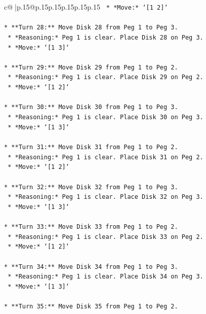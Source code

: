\documentclass{article}
\begin{document}
{\begin{supertabular}{c@{$\;$}|p{.15\linewidth}@{}p{.15\linewidth}p{.15\linewidth}p{.15\linewidth}p{.15\linewidth}p{.15\linewidth}}
{{{\texttt{    *   *Move:* `{[}1 2{]}`} \\
\\ 
\texttt{*   **Turn 28:** Move Disk 28 from Peg 1 to Peg 3.} \\
\texttt{    *   *Reasoning:* Peg 1 is clear. Place Disk 28 on Peg 3.} \\
\texttt{    *   *Move:* `{[}1 3{]}`} \\
\\ 
\texttt{*   **Turn 29:** Move Disk 29 from Peg 1 to Peg 2.} \\
\texttt{    *   *Reasoning:* Peg 1 is clear. Place Disk 29 on Peg 2.} \\
\texttt{    *   *Move:* `{[}1 2{]}`} \\
\\ 
\texttt{*   **Turn 30:** Move Disk 30 from Peg 1 to Peg 3.} \\
\texttt{    *   *Reasoning:* Peg 1 is clear. Place Disk 30 on Peg 3.} \\
\texttt{    *   *Move:* `{[}1 3{]}`} \\
\\ 
\texttt{*   **Turn 31:** Move Disk 31 from Peg 1 to Peg 2.} \\
\texttt{    *   *Reasoning:* Peg 1 is clear. Place Disk 31 on Peg 2.} \\
\texttt{    *   *Move:* `{[}1 2{]}`} \\
\\ 
\texttt{*   **Turn 32:** Move Disk 32 from Peg 1 to Peg 3.} \\
\texttt{    *   *Reasoning:* Peg 1 is clear. Place Disk 32 on Peg 3.} \\
\texttt{    *   *Move:* `{[}1 3{]}`} \\
\\ 
\texttt{*   **Turn 33:** Move Disk 33 from Peg 1 to Peg 2.} \\
\texttt{    *   *Reasoning:* Peg 1 is clear. Place Disk 33 on Peg 2.} \\
\texttt{    *   *Move:* `{[}1 2{]}`} \\
\\ 
\texttt{*   **Turn 34:** Move Disk 34 from Peg 1 to Peg 3.} \\
\texttt{    *   *Reasoning:* Peg 1 is clear. Place Disk 34 on Peg 3.} \\
\texttt{    *   *Move:* `{[}1 3{]}`} \\
\\ 
\texttt{*   **Turn 35:** Move Disk 35 from Peg 1 to Peg 2.} \\
}}}
\end{supertabular}}
\end{document}
